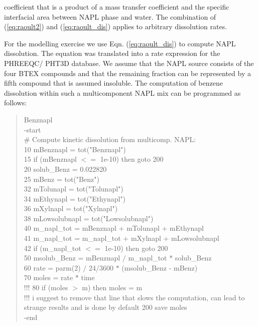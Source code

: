 coefficient that is a product of a mass transfer coefficient and
the specific interfacial area between NAPL phase and water. The
combination of (\ref{eq:raoult2}) and (\ref{eq:raoult_dis})
applies to arbitrary dissolution rates. 
\par For the modelling exercise we use Eqn. (\ref{eq:raoult_dis}) to
compute NAPL dissolution. The equation was translated into a rate expression 
for the PHREEQC/ PHT3D database. We assume that the NAPL source
consists of the four BTEX compounds and that the remaining 
fraction can be represented by a fifth compound that is 
assumed insoluble. The computation of benzene 
dissolution within such a multicomponent NAPL mix can be programmed
as follows:
\\
{\color{red}
\begin{quote}
Benznapl \\
  -start  \\
\#  Compute kinetic dissolution from multicomp. NAPL: \\
   10  mBenznapl = tot("Benznapl")    \\
   15  if (mBenznapl $<=$ 1e-10) then goto 200  \\
   20  solub\_Benz = 0.022820  \\
   25  mBenz = tot("Benz")  \\
   32  mTolunapl = tot("Tolunapl")  \\
   34  mEthynapl = tot("Ethynapl")  \\
   36  mXylnapl  = tot("Xylnapl")  \\
   38  mLowsolubnapl  = tot("Lowsolubnapl")  \\
   40  m\_napl\_tot = mBenznapl + mTolunapl + mEthynapl \\
   41  m\_napl\_tot = m\_napl\_tot + mXylnapl + mLowsolubnapl  \\
   42  if (m\_napl\_tot $<=$ 1e-10) then goto 200  \\
   50  msolub\_Benz =  mBenznapl $/$ m\_napl\_tot $*$ solub\_Benz  \\
   60  rate = parm(2) $/$ 24/3600  $*$ (msolub\_Benz - mBenz)\\                                   
   70  moles = rate $*$ time  \\
    !!! 80  if (moles $>$ m) then moles = m  \\ !!! i suggest to remove that line that slows the computation, can lead to strange results and is done by default
   200 save moles\\
  -end  \\
 \end{quote}
 }
 
